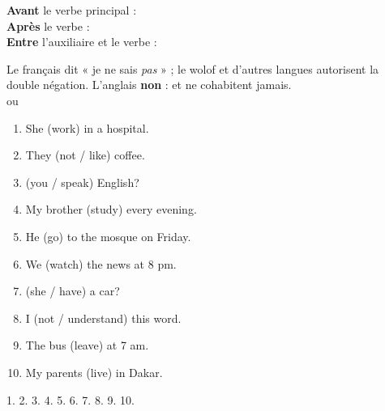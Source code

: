 \begin{regle}[Placement]
\textbf{Avant} le verbe principal : \\
\textbf{Après} le verbe  : \\
\textbf{Entre} l'auxiliaire et le verbe : 
\end{regle}

\begin{piege}
Le français dit « je ne sais \emph{pas} » ; le wolof et d'autres langues autorisent la double
négation. L'anglais \textbf{non} :  et  ne cohabitent jamais.\\
 \ra {} ou 
\end{piege}

\begin{exo}
\begin{enumerate}
  \item She (work) \trou[2cm] in a hospital.
  \item They (not / like) \trou[2cm] coffee.
  \item (you / speak) \trou[2.5cm] English?
  \item My brother (study) \trou[2cm] every evening.
  \item He (go) \trou[2cm] to the mosque on Friday.
  \item We (watch) \trou[2cm] the news at 8 pm.
  \item (she / have) \trou[2.5cm] a car?
  \item I (not / understand) \trou[2.5cm] this word.
  \item The bus (leave) \trou[2cm] at 7 am.
  \item My parents (live) \trou[2cm] in Dakar.
\end{enumerate}
\end{exo}
\begin{corrige}[3.1]
1.  2.  3.  4.  5. 
6.  7.  8.  9.  10. 
\end{corrige}

